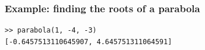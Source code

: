 \begin{frame}[fragile]
  \frametitle{Example: finding the roots of a parabola}
  \begin{lstlisting}
>> parabola(1, -4, -3)
[-0.6457513110645907, 4.645751311064591]
  \end{lstlisting}
\end{frame}


%
%      
%
